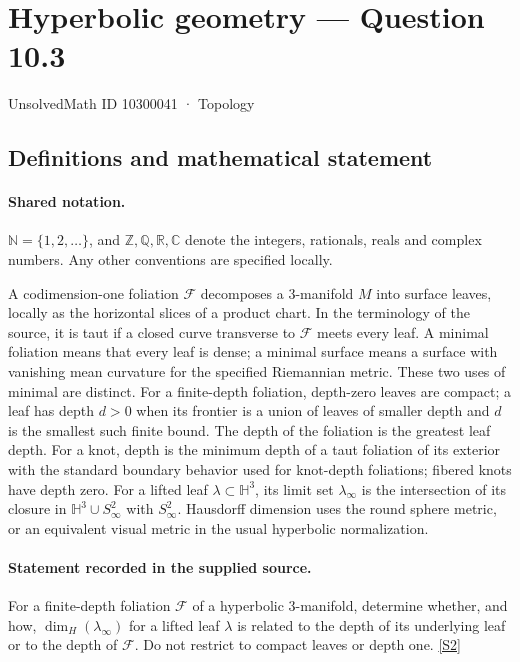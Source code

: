 \documentclass[11pt]{article}
\newcommand{\sref}[2]{\hyperlink{source:#1:#2}{[S#2]}}
\begin{document}
\setcounter{section}{10300040}
\section{Hyperbolic geometry — Question 10.3}\label{10300041}
{\small\sffamily UnsolvedMath ID 10300041 · Topology}
\subsection{Definitions and mathematical statement}

\paragraph{Shared notation.}$\mathbb N=\{1,2,\ldots\}$, and $\mathbb Z,\mathbb Q,\mathbb R,\mathbb C$ denote the integers, rationals, reals and complex numbers. Any other conventions are specified locally.


A codimension-one foliation $\mathcal F$ decomposes a $3$-manifold $M$ into surface leaves, locally as the horizontal slices of a product chart. In the terminology of the source, it is taut if a closed curve transverse to $\mathcal F$ meets every leaf. A minimal foliation means that every leaf is dense; a minimal surface means a surface with vanishing mean curvature for the specified Riemannian metric. These two uses of minimal are distinct. For a finite-depth foliation, depth-zero leaves are compact; a leaf has depth $d>0$ when its frontier is a union of leaves of smaller depth and $d$ is the smallest such finite bound. The depth of the foliation is the greatest leaf depth. For a knot, depth is the minimum depth of a taut foliation of its exterior with the standard boundary behavior used for knot-depth foliations; fibered knots have depth zero. For a lifted leaf $\lambda\subset\mathbb H^3$, its limit set $\lambda_\infty$ is the intersection of its closure in $\mathbb H^3\cup S^2_\infty$ with $S^2_\infty$. Hausdorff dimension uses the round sphere metric, or an equivalent visual metric in the usual hyperbolic normalization.
\paragraph{Statement recorded in the supplied source.}
For a finite-depth foliation $\mathcal F$ of a hyperbolic $3$-manifold, determine whether, and how, $\dim_H(\lambda_\infty)$ for a lifted leaf $\lambda$ is related to the depth of its underlying leaf or to the depth of $\mathcal F$. Do not restrict to compact leaves or depth one. \sref{10300041}{2}
\end{document}
